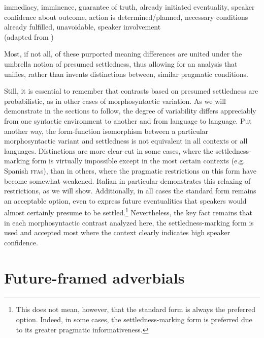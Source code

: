 \documentclass[output=paper,colorlinks,citecolor=brown]{langscibook}
\begin{document}
\begin{exe}
\ex\label{ex:hoff:laundrylist} immediacy, imminence, guarantee of truth, already initiated eventuality, speaker confidence about outcome, action is determined/planned, necessary conditions already fulfilled, unavoidable, speaker involvement\\
(adapted from \citealt{PoplackTurpin1999})
\end{exe}

\noindent Most, if not all, of these purported meaning differences are united under the umbrella notion of presumed settledness, thus allowing for an analysis that unifies, rather than invents distinctions between, similar pragmatic conditions. 

Still, it is essential to remember that contrasts based on presumed settledness are probabilistic, as in other cases of morphosyntactic variation. As we will demonstrate in the sections to follow, the degree of variability differs appreciably from one syntactic environment to another and from language to language. Put another way, the form-function isomorphism between a particular morphosyntactic variant and settledness is not equivalent in all contexts or all languages. Distinctions are more clear-cut in some cases, where the settledness-marking form is virtually impossible except in the most certain contexts (e.g. Spanish \textsc{ffa}s), than in others, where the pragmatic restrictions on this form have become somewhat weakened. Italian in particular demonstrates this relaxing of restrictions, as we will show. Additionally, in all cases the standard form remains an acceptable option, even to express future eventualities that speakers would almost certainly presume to be settled.\footnote{This does not mean, however, that the standard form is always the preferred option. Indeed, in some cases, the settledness-marking form is preferred due to its greater pragmatic informativeness.} Nevertheless, the key fact remains that in each morphosyntactic contrast analyzed here, the settledness-marking form is used and accepted most where the context clearly indicates high speaker confidence.

\section{Future-framed adverbials}\label{sec:hoff:ffas}
\end{document}
